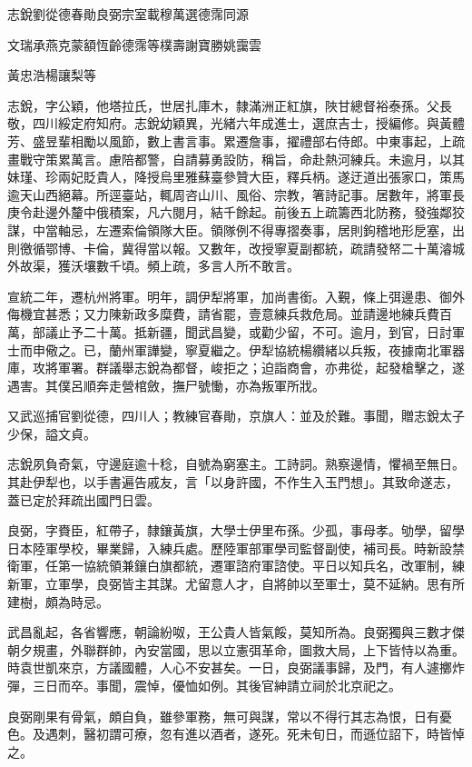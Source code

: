 
\begin{pinyinscope}
志銳劉從德春勛良弼宗室載穆萬選德霈同源

文瑞承燕克蒙額恆齡德霈等樸壽謝寶勝姚靄雲

黃忠浩楊讓梨等

志銳，字公穎，他塔拉氏，世居扎庫木，隸滿洲正紅旗，陜甘總督裕泰孫。父長敬，四川綏定府知府。志銳幼穎異，光緒六年成進士，選庶吉士，授編修。與黃體芳、盛昱輩相勵以風節，數上書言事。累遷詹事，擢禮部右侍郎。中東事起，上疏畫戰守策累萬言。慮陪都警，自請募勇設防，稱旨，命赴熱河練兵。未逾月，以其妹瑾、珍兩妃貶貴人，降授烏里雅蘇臺參贊大臣，釋兵柄。遂迂道出張家口，策馬逾天山西絕幕。所逕臺站，輒周咨山川、風俗、宗教，箸詩記事。居數年，將軍長庚令赴邊外釐中俄積案，凡六閱月，結千餘起。前後五上疏籌西北防務，發強鄰狡謀，中當軸忌，左遷索倫領隊大臣。領隊例不得專摺奏事，居則鉤稽地形戹塞，出則徼循鄂博、卡倫，冀得當以報。又數年，改授寧夏副都統，疏請發帑二十萬濬城外故渠，獲沃壤數千頃。頻上疏，多言人所不敢言。

宣統二年，遷杭州將軍。明年，調伊犁將軍，加尚書銜。入覲，條上弭邊患、御外侮機宜甚悉；又力陳新政多糜費，請省罷，壹意練兵救危局。並請邊地練兵費百萬，部議止予二十萬。抵新疆，聞武昌變，或勸少留，不可。逾月，到官，日討軍士而申儆之。已，蘭州軍譁變，寧夏繼之。伊犁協統楊纘緒以兵叛，夜據南北軍器庫，攻將軍署。群議舉志銳為都督，峻拒之；迫詣商會，亦弗從，起發槍擊之，遂遇害。其僕呂順奔走營棺斂，撫尸號慟，亦為叛軍所戕。

又武巡捕官劉從德，四川人；教練官春勛，京旗人：並及於難。事聞，贈志銳太子少保，謚文貞。

志銳夙負奇氣，守邊庭逾十稔，自號為窮塞主。工詩詞。熟察邊情，懼禍至無日。其赴伊犁也，以手書遍告戚友，言「以身許國，不作生入玉門想」。其致命遂志，蓋已定於拜疏出國門日雲。

良弼，字賚臣，紅帶子，隸鑲黃旗，大學士伊里布孫。少孤，事母孝。劬學，留學日本陸軍學校，畢業歸，入練兵處。歷陸軍部軍學司監督副使，補司長。時新設禁衛軍，任第一協統領兼鑲白旗都統，遷軍諮府軍諮使。平日以知兵名，改軍制，練新軍，立軍學，良弼皆主其謀。尤留意人才，自將帥以至軍士，莫不延納。思有所建樹，頗為時忌。

武昌亂起，各省響應，朝論紛呶，王公貴人皆氣餒，莫知所為。良弼獨與三數才傑朝夕規畫，外聯群帥，內安當國，思以立憲弭革命，圖救大局，上下皆恃以為重。時袁世凱來京，方議國體，人心不安甚矣。一日，良弼議事歸，及門，有人遽擲炸彈，三日而卒。事聞，震悼，優恤如例。其後官紳請立祠於北京祀之。

良弼剛果有骨氣，頗自負，雖參軍務，無可與謀，常以不得行其志為恨，日有憂色。及遇刺，醫初謂可療，忽有進以酒者，遂死。死未旬日，而遜位詔下，時皆悼之。


\end{pinyinscope}

